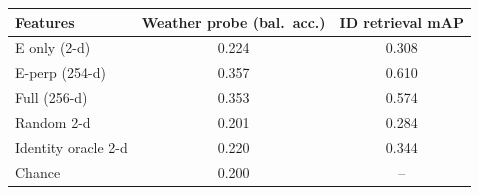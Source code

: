 \begin{tabular}{lcc}
\toprule
Features & Weather probe (bal.\ acc.) & ID retrieval mAP \\
\midrule
E only (2-d) & 0.224 & 0.308 \\
E-perp (254-d) & 0.357 & 0.610 \\
Full (256-d) & 0.353 & 0.574 \\
Random 2-d & 0.201 & 0.284 \\
Identity oracle 2-d & 0.220 & 0.344 \\
\midrule
Chance & 0.200 & -- \\
\bottomrule
\end{tabular}
